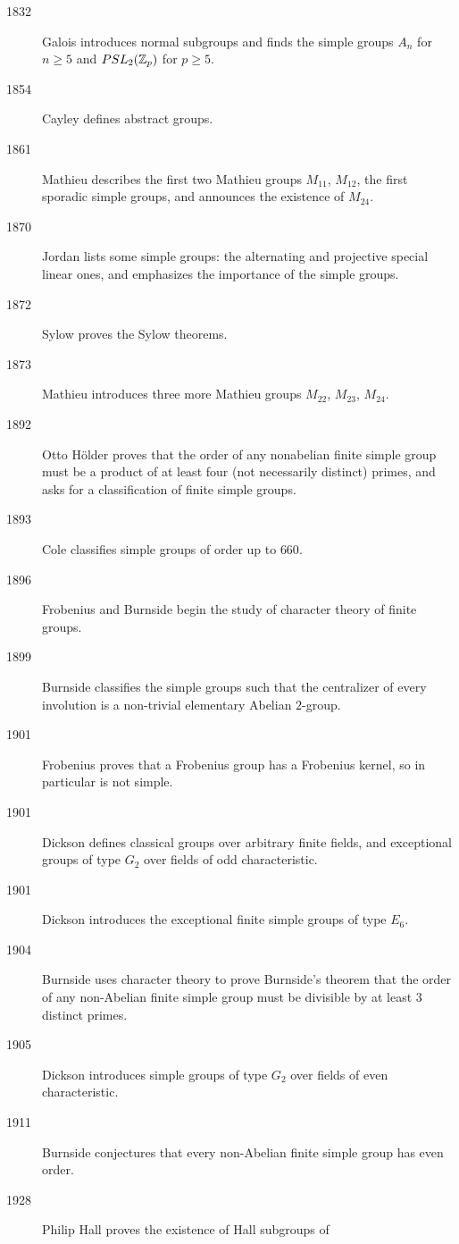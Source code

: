\documentclass{ximera}
\begin{document}
\begin{description}
\item[1832] Galois introduces normal subgroups and finds the simple
  groups $A_n$ for $n\ge 5$ and $PSL_2(\mathbb Z_p)$ for $p\ge 5$.
\item[1854]	Cayley defines abstract groups.
\item[1861] Mathieu describes the first two Mathieu groups $M_{11}$,
  $M_{12}$, the first sporadic simple groups, and announces the
  existence of $M_{24}$.
\item[1870] Jordan lists some simple groups: the alternating and
  projective special linear ones, and emphasizes the importance of the
  simple groups.
\item[1872] Sylow proves the Sylow theorems.
\item[1873] Mathieu introduces three more Mathieu groups $M_{22}$,
  $M_{23}$, $M_{24}$.
\item[1892] Otto H\"older proves that the order of any nonabelian
  finite simple group must be a product of at least four (not
  necessarily distinct) primes, and asks for a classification of
  finite simple groups.
\item[1893] Cole classifies simple groups of order up to $660$.
\item[1896]	Frobenius and Burnside begin the study of character theory of finite groups.
\item[1899] Burnside classifies the simple groups such that the
  centralizer of every involution is a non-trivial elementary Abelian
  $2$-group.
\item[1901] Frobenius proves that a Frobenius group has a Frobenius
  kernel, so in particular is not simple.
\item[1901] Dickson defines classical groups over arbitrary finite
  fields, and exceptional groups of type $G_2$ over fields of odd
  characteristic.
\item[1901] Dickson introduces the exceptional finite simple groups of
  type $E_6$.
\item[1904] Burnside uses character theory to prove Burnside's theorem
  that the order of any non-Abelian finite simple group must be
  divisible by at least $3$ distinct primes.
\item[1905] Dickson introduces simple groups of type $G_2$ over fields
  of even characteristic.
\item[1911] Burnside conjectures that every non-Abelian finite simple
  group has even order.
\item[1928] Philip Hall proves the existence of Hall subgroups of

\end{description}
\end{document}
